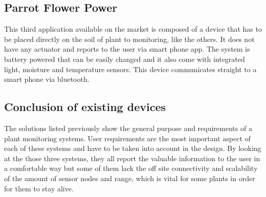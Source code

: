 \subsection{Parrot Flower Power}
This third application available on the market is composed of a device that has to be placed directly on the soil of plant to monitoring, like the others. It does not have any actuator and reports to the user via smart phone app. The system is battery powered that can be easily changed and it also come with integrated light, moisture and temperature sensors. This device communicates straight to a smart phone via bluetooth. \cite{parrot}

\subsection{Conclusion of existing devices}
The solutions listed previously show the general purpose and requirements of a plant monitoring systems. User requirements are the most important aspect of each of these systems and have to be taken into account in the design. By looking at the those three systems, they all report the valuable information to the user in a comfortable way but some of them lack the off site connectivity and scalability of the amount of sensor nodes and range, which is vital for some plants in order for them to stay alive. 
